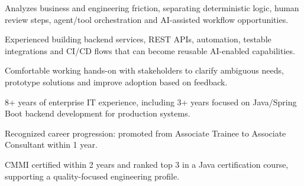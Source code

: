 \documentclass[11pt, a4paper]{awesome-cv}
\begin{document}
\makecvheader

\vspace{-0.5ex}
\noindent{}\par
\vspace{0.6ex}
\noindent{}\par
\vspace{0.6ex}
\noindent{}\par

\begin{cvitems}
  \item {Analyzes business and engineering friction, separating deterministic logic, human review steps, agent/tool orchestration and AI-assisted workflow opportunities.}
  \item {Experienced building backend services, REST APIs, automation, testable integrations and CI/CD flows that can become reusable AI-enabled capabilities.}
  \item {Comfortable working hands-on with stakeholders to clarify ambiguous needs, prototype solutions and improve adoption based on feedback.}
  \item {8+ years of enterprise IT experience, including 3+ years focused on Java/Spring Boot backend development for production systems.}
  \item {Recognized career progression: promoted from Associate Trainee to Associate Consultant within 1 year.}
  \item {CMMI certified within 2 years and ranked top 3 in a Java certification course, supporting a quality-focused engineering profile.}
\end{cvitems}
\end{document}
